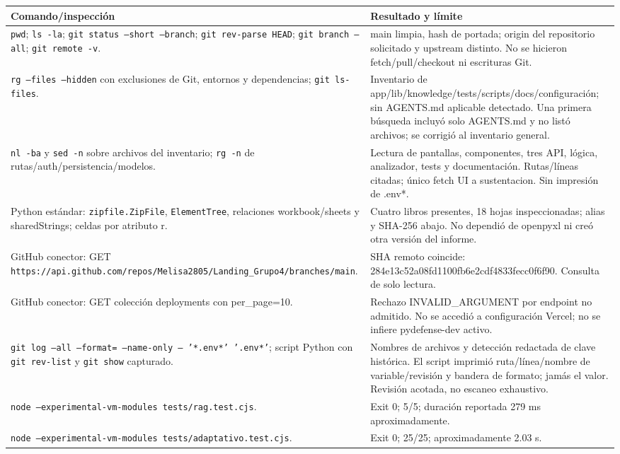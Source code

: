 \documentclass[11pt,a4paper]{report}
\begin{document}
\begin{longtable}{P{7cm}P{9cm}}
\toprule Comando/inspección & Resultado y límite \\\midrule\endhead
\texttt{pwd}; \texttt{ls -la}; \texttt{git status --short --branch}; \texttt{git rev-parse HEAD}; \texttt{git branch --all}; \texttt{git remote -v}. & main limpia, hash de portada; origin del repositorio solicitado y upstream distinto. No se hicieron fetch/pull/checkout ni escrituras Git.\\
\texttt{rg --files --hidden} con exclusiones de Git, entornos y dependencias; \texttt{git ls-files}. & Inventario de app/lib/knowledge/tests/scripts/docs/configuración; sin AGENTS.md aplicable detectado. Una primera búsqueda incluyó solo AGENTS.md y no listó archivos; se corrigió al inventario general.\\
\texttt{nl -ba} y \texttt{sed -n} sobre archivos del inventario; \texttt{rg -n} de rutas/auth/persistencia/modelos. & Lectura de pantallas, componentes, tres API, lógica, analizador, tests y documentación. Rutas/líneas citadas; único fetch UI a sustentacion. Sin impresión de .env*.\\
Python estándar: \texttt{zipfile.ZipFile}, \texttt{ElementTree}, relaciones workbook/sheets y sharedStrings; celdas por atributo r. & Cuatro libros presentes, 18 hojas inspeccionadas; alias y SHA-256 abajo. No dependió de openpyxl ni creó otra versión del informe.\\
GitHub conector: GET \nolinkurl{https://api.github.com/repos/Melisa2805/Landing_Grupo4/branches/main}. & SHA remoto coincide: 284e13c52a08fd1100fb6e2cdf4833fecc0f6f90. Consulta de solo lectura.\\
GitHub conector: GET colección deployments con per\_page=10. & Rechazo INVALID\_ARGUMENT por endpoint no admitido. No se accedió a configuración Vercel; no se infiere pydefense-dev activo.\\
\texttt{git log --all --format= --name-only -- '*.env*' '.env*'}; script Python con \texttt{git rev-list} y \texttt{git show} capturado. & Nombres de archivos y detección redactada de clave histórica. El script imprimió ruta/línea/nombre de variable/revisión y bandera de formato; jamás el valor. Revisión acotada, no escaneo exhaustivo.\\
\texttt{node --experimental-vm-modules tests/rag.test.cjs}. & Exit 0; 5/5; duración reportada 279 ms aproximadamente.\\
\texttt{node --experimental-vm-modules tests/adaptativo.test.cjs}. & Exit 0; 25/25; aproximadamente 2.03 s.\\

\end{longtable}
\end{document}
